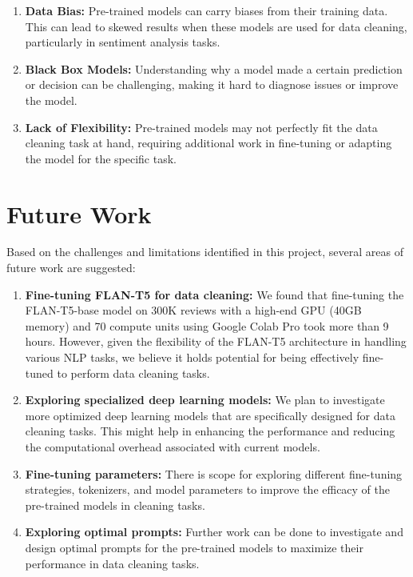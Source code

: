 \documentclass{article}
\begin{document}
\begin{enumerate}
    \item \textbf{Data Bias:} Pre-trained models can carry biases from their training data. This can lead to skewed results when these models are used for data cleaning, particularly in sentiment analysis tasks.
    
    \item \textbf{Black Box Models:} Understanding why a model made a certain prediction or decision can be challenging, making it hard to diagnose issues or improve the model.
    
    \item \textbf{Lack of Flexibility:} Pre-trained models may not perfectly fit the data cleaning task at hand, requiring additional work in fine-tuning or adapting the model for the specific task.
\end{enumerate}



\section{Future Work}

Based on the challenges and limitations identified in this project, several areas of future work are suggested:

\begin{enumerate}
    \item \textbf{Fine-tuning FLAN-T5 for data cleaning:} We found that fine-tuning the FLAN-T5-base model on 300K reviews with a high-end GPU (40GB memory) and 70 compute units using Google Colab Pro took more than 9 hours. However, given the flexibility of the FLAN-T5 architecture in handling various NLP tasks, we believe it holds potential for being effectively fine-tuned to perform data cleaning tasks.
    
    \item \textbf{Exploring specialized deep learning models:} We plan to investigate more optimized deep learning models that are specifically designed for data cleaning tasks. This might help in enhancing the performance and reducing the computational overhead associated with current models.
    
    \item \textbf{Fine-tuning parameters:} There is scope for exploring different fine-tuning strategies, tokenizers, and model parameters to improve the efficacy of the pre-trained models in cleaning tasks.
    
    \item \textbf{Exploring optimal prompts:} Further work can be done to investigate and design optimal prompts for the pre-trained models to maximize their performance in data cleaning tasks.
\end{enumerate}
\end{document}
